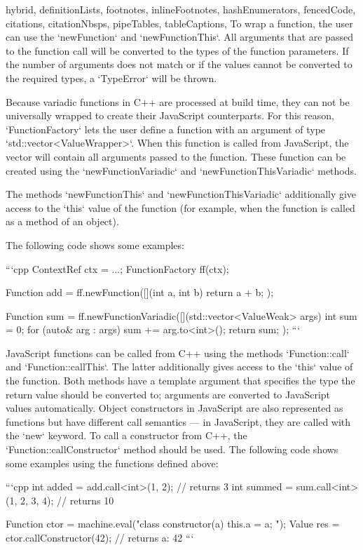 \begin{markdown*}{%
  hybrid,
  definitionLists,
  footnotes,
  inlineFootnotes,
  hashEnumerators,
  fencedCode,
  citations,
  citationNbsps,
  pipeTables,
  tableCaptions,
}
To wrap a function, the user can use the `newFunction` and `newFunctionThis`. All arguments that are passed to the function call will be converted to the types of the function parameters. If the number of arguments does not match or if the values cannot be converted to the required types, a `TypeError` will be thrown.

Because variadic functions in C++ are processed at build time, they can not be universally wrapped to create their JavaScript counterparts. For this reason, `FunctionFactory` lets the user define a function with an argument of type `std::vector<ValueWrapper>`. When this function is called from JavaScript, the vector will contain all arguments passed to the function. These function can be created using the `newFunctionVariadic` and `newFunctionThisVariadic` methods.

The methods `newFunctionThis` and `newFunctionThisVariadic` additionally give access to the `this` value of the function (for example, when the function is called as a method of an object).

The following code shows some examples:

```cpp
ContextRef ctx = ...;
FunctionFactory ff(ctx);

Function add = ff.newFunction([](int a, int b) { return a + b; });

Function sum = ff.newFunctionVariadic([](std::vector<ValueWeak> args) {
  int sum = 0;
  for (auto& arg : args) {
    sum += arg.to<int>();
  }
  return sum;
});
```

JavaScript functions can be called from C++ using the methods `Function::call` and `Function::callThis`. The latter additionally gives access to the `this` value of the function. Both methods have a template argument that specifies the type the return value should be converted to; arguments are converted to JavaScript values automatically. Object constructors in JavaScript are also represented as functions but have different call semantics --- in JavaScript, they are called with the `new` keyword. To call a constructor from C++, the `Function::callConstructor` method should be used. The following code shows some examples using the functions defined above:

```cpp
int added = add.call<int>(1, 2);  // returns 3
int summed = sum.call<int>(1, 2, 3, 4);  // returns 10

Function ctor = machine.eval("class { constructor(a) { this.a = a; } }");
Value res = ctor.callConstructor(42);  // returns { a: 42 }
```



\end{markdown*}
